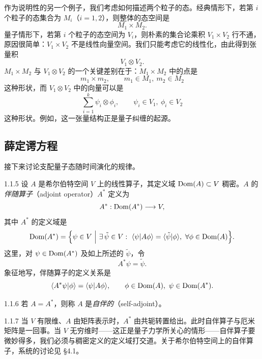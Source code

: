 作为说明性的另一个例子，我们考虑如何描述两个粒子的态。经典情形下，若第 $i$ 个粒子的态集合为 $M_i$（$i=1,2$），则整体的态空间是
\[
M_1\times M_2.
\]
量子情形下，若第 $i$ 个粒子的态空间为 $V_i$，则朴素的集合论乘积 $V_1\times V_2$ 行不通，原因很简单：$V_1\times V_2$ 不是线性向量空间。我们只能考虑它的线性化，由此得到张量积
\[
V_1\otimes V_2.
\]
$M_1\times M_2$ 与 $V_1\otimes V_2$ 的一个关键差别在于：$M_1\times M_2$ 中的点是
\[
m_1\times m_2,\qquad m_1\in M_1,\ m_2\in M_2
\]
这种形状，而 $V_1\otimes V_2$ 中的向量可以是
\[
\sum_{i=1}^{k}\psi_i\otimes\phi_i,\qquad \psi_i\in V_1,\ \phi_i\in V_2
\]
这种形状。例如，这一张量结构正是量子纠缠的起源。


\subsection{薛定谔方程}

接下来讨论支配量子态随时间演化的规律。

\begin{definition}{1.1.5}
  设 $A$ 是希尔伯特空间 $V$ 上的线性算子，其定义域 $\operatorname{Dom}(A)\subset V$ 稠密。$A$ 的\emph{伴随算子}（adjoint operator）$A^*$ 定义为
  \[
  A^*:\operatorname{Dom}(A^*)\longrightarrow V,
  \]
  其中 $A^*$ 的定义域是
  \[
  \Dom(A^*)=\Bigl\{\psi\in V\ \Big|\ \exists\,\tilde\psi\in V:\ 
  \langle\psi|A\phi\rangle=\langle\tilde\psi|\phi\rangle,\ \forall\phi\in\Dom(A)\Bigr\}.
  \]
  这里，对 $\psi\in\operatorname{Dom}(A^*)$ 及如上所述的 $\tilde\psi$，令
  \[
  A^*\psi=\tilde\psi.
  \]
  象征地写，伴随算子的定义关系是
  \[
  \langle A^*\psi|\phi\rangle=\langle\psi|A\phi\rangle,
  \qquad \phi\in\operatorname{Dom}(A),\ \psi\in\operatorname{Dom}(A^*).
  \]
\end{definition}

\begin{definition}{1.1.6}
  若 $A=A^*$，则称 $A$ 是\emph{自伴的}（self-adjoint）。
\end{definition}

\begin{remark}{1.1.7}
  当 $V$ 有限维、$A$ 由矩阵表示时，$A^*$ 由共轭转置给出。此时自伴算子与厄米矩阵是一回事。当 $V$ 无穷维时——这正是量子力学所关心的情形——自伴算子要微妙得多，我们必须与稠密定义的定义域打交道。关于希尔伯特空间上的自伴算子，系统的讨论见 §4.1。
\end{remark}

